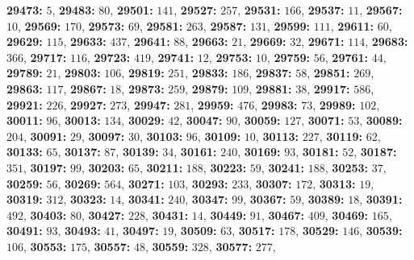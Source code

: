 \textsf{\bfseries 29473:} $5$, \textsf{\bfseries 29483:} $80$, \textsf{\bfseries 29501:} $141$, \textsf{\bfseries 29527:} $257$, \textsf{\bfseries 29531:} $166$, \textsf{\bfseries 29537:} $11$, \textsf{\bfseries 29567:} $10$, \textsf{\bfseries 29569:} $170$, \textsf{\bfseries 29573:} $69$, \textsf{\bfseries 29581:} $263$, \textsf{\bfseries 29587:} $131$, \textsf{\bfseries 29599:} $111$, \textsf{\bfseries 29611:} $60$, \textsf{\bfseries 29629:} $115$, \textsf{\bfseries 29633:} $437$, \textsf{\bfseries 29641:} $88$, \textsf{\bfseries 29663:} $21$, \textsf{\bfseries 29669:} $32$, \textsf{\bfseries 29671:} $114$, \textsf{\bfseries 29683:} $366$, \textsf{\bfseries 29717:} $116$, \textsf{\bfseries 29723:} $419$, \textsf{\bfseries 29741:} $12$, \textsf{\bfseries 29753:} $10$, \textsf{\bfseries 29759:} $56$, \textsf{\bfseries 29761:} $44$, \textsf{\bfseries 29789:} $21$, \textsf{\bfseries 29803:} $106$, \textsf{\bfseries 29819:} $251$, \textsf{\bfseries 29833:} $186$, \textsf{\bfseries 29837:} $58$, \textsf{\bfseries 29851:} $269$, \textsf{\bfseries 29863:} $117$, \textsf{\bfseries 29867:} $18$, \textsf{\bfseries 29873:} $259$, \textsf{\bfseries 29879:} $109$, \textsf{\bfseries 29881:} $38$, \textsf{\bfseries 29917:} $586$, \textsf{\bfseries 29921:} $226$, \textsf{\bfseries 29927:} $273$, \textsf{\bfseries 29947:} $281$, \textsf{\bfseries 29959:} $476$, \textsf{\bfseries 29983:} $73$, \textsf{\bfseries 29989:} $102$, \textsf{\bfseries 30011:} $96$, \textsf{\bfseries 30013:} $134$, \textsf{\bfseries 30029:} $42$, \textsf{\bfseries 30047:} $90$, \textsf{\bfseries 30059:} $127$, \textsf{\bfseries 30071:} $53$, \textsf{\bfseries 30089:} $204$, \textsf{\bfseries 30091:} $29$, \textsf{\bfseries 30097:} $30$, \textsf{\bfseries 30103:} $96$, \textsf{\bfseries 30109:} $10$, \textsf{\bfseries 30113:} $227$, \textsf{\bfseries 30119:} $62$, \textsf{\bfseries 30133:} $65$, \textsf{\bfseries 30137:} $87$, \textsf{\bfseries 30139:} $34$, \textsf{\bfseries 30161:} $240$, \textsf{\bfseries 30169:} $93$, \textsf{\bfseries 30181:} $52$, \textsf{\bfseries 30187:} $351$, \textsf{\bfseries 30197:} $99$, \textsf{\bfseries 30203:} $65$, \textsf{\bfseries 30211:} $188$, \textsf{\bfseries 30223:} $59$, \textsf{\bfseries 30241:} $188$, \textsf{\bfseries 30253:} $37$, \textsf{\bfseries 30259:} $56$, \textsf{\bfseries 30269:} $564$, \textsf{\bfseries 30271:} $103$, \textsf{\bfseries 30293:} $233$, \textsf{\bfseries 30307:} $172$, \textsf{\bfseries 30313:} $19$, \textsf{\bfseries 30319:} $312$, \textsf{\bfseries 30323:} $14$, \textsf{\bfseries 30341:} $240$, \textsf{\bfseries 30347:} $99$, \textsf{\bfseries 30367:} $59$, \textsf{\bfseries 30389:} $18$, \textsf{\bfseries 30391:} $492$, \textsf{\bfseries 30403:} $80$, \textsf{\bfseries 30427:} $228$, \textsf{\bfseries 30431:} $14$, \textsf{\bfseries 30449:} $91$, \textsf{\bfseries 30467:} $409$, \textsf{\bfseries 30469:} $165$, \textsf{\bfseries 30491:} $93$, \textsf{\bfseries 30493:} $41$, \textsf{\bfseries 30497:} $19$, \textsf{\bfseries 30509:} $63$, \textsf{\bfseries 30517:} $178$, \textsf{\bfseries 30529:} $146$, \textsf{\bfseries 30539:} $106$, \textsf{\bfseries 30553:} $175$, \textsf{\bfseries 30557:} $48$, \textsf{\bfseries 30559:} $328$, \textsf{\bfseries 30577:} $277$, 

